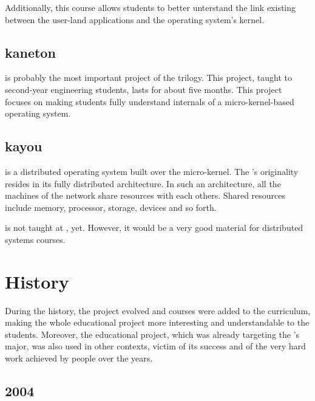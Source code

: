 \begin{multicols}{2}
Additionally, this course allows students to better unterstand the link
existing between the user-land applications and the operating system's kernel.

%
%

\subsection{kaneton}

 is probably the most important project of the trilogy. This
project, taught to second-year engineering students, lasts for about five
months. This project focuses on making students fully understand
internals of a micro-kernel-based operating system.

%
%

\subsection{kayou}

 is a distributed operating system built over the 
micro-kernel. The 's originality resides in its fully distributed
architecture. In such an architecture, all the machines of the network share
resources with each others. Shared resources include memory, processor,
storage, devices and so forth.

 is not taught at , yet. However, it would be a very
good material for distributed systems courses.

%
%

\section{History}

During the  history, the project evolved and courses were added
to the curriculum, making the whole educational project more interesting and
understandable to the students. Moreover, the educational project, which
was already targeting the 's  major, was also used in other contexts, victim of its success
and of the very hard work achieved by  people over the years.

%
%

\subsection{2004}


\end{multicols}
